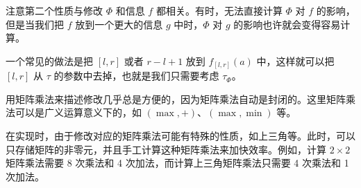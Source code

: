 \begin{remark}
    注意第二个性质与修改 $\Phi$ 和信息 $f$ 都相关。有时，无法直接计算 $\Phi$ 对 $f$ 的影响，但是当我们把 $f$ 放到一个更大的信息 $g$ 中时，$\Phi$ 对 $g$ 的影响也许就会变得容易计算。

    一个常见的做法是把 $[l,r]$ 或者 $r-l+1$ 放到 $f_{[l,r]}(a)$ 中，这样就可以把 $[l,r]$ 从 $\tau$ 的参数中去掉，也就是我们只需要考虑 $\tau_{\Phi}$。
\end{remark}

\begin{remark}
    用矩阵乘法来描述修改几乎总是方便的，因为矩阵乘法自动是封闭的。这里矩阵乘法可以是广义运算意义下的，如 $(\max,+)$、$(\max,\min)$ 等。

    在实现时，由于修改对应的矩阵乘法可能有特殊的性质，如上三角等。此时，可以只存储矩阵的非零元，并且手工计算这种矩阵乘法来加快效率。例如，计算 $2\times 2$ 矩阵乘法需要 8 次乘法和 4 次加法，而计算上三角矩阵乘法只需要 4 次乘法和 1 次加法。
\end{remark}


